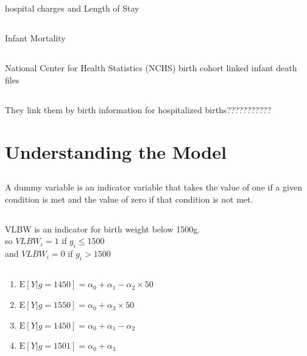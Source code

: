 \documentclass[11pt]{article}
\newcommand{\E}{\mathrm{E}}
\begin{document}
\subsection{}
hospital charges and Length of Stay

\subsection{}
Infant Mortality

\subsection{}
National Center for Health Statistics (NCHS) birth cohort linked infant death files 

\subsection{}
They link them by birth information for hospitalized births???????????

\section{Understanding the Model}

\subsection{}
 A dummy variable is an indicator variable that takes the value of one if a given condition is met and      the value of zero if that condition is not met. 
 
 \subsection{}
 VLBW is an indicator for birth weight below 1500g. \\
 so $VLBW_i = 1 $ if $g_i \leq 1500$ \\
 and  $VLBW_i = 0 $ if $g_i > 1500$
 
 \subsection{}
 
  \renewcommand{\theenumi}{\roman{enumi}}
  \begin{enumerate}
  	\item $\E[Y|g=1450] = \alpha_0 + \alpha_1 - \alpha_2 \times 50 $
  	\item $\E[Y|g=1550] = \alpha_0 + \alpha_3 \times 50 $
  	\item$\E[Y|g=1450] = \alpha_0 + \alpha_1 - \alpha_2$
  		\item $\E[Y|g=1501] = \alpha_0 + \alpha_3$
  \end{enumerate}
\end{document}
